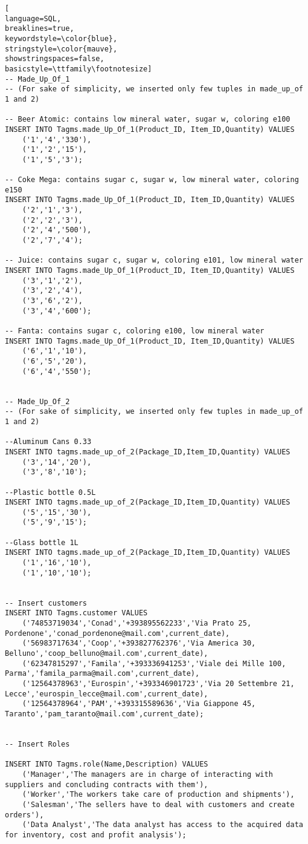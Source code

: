 \begin{lstlisting}[
language=SQL,
breaklines=true,
keywordstyle=\color{blue},
stringstyle=\color{mauve},
showstringspaces=false,
basicstyle=\ttfamily\footnotesize]
-- Made_Up_Of_1
-- (For sake of simplicity, we inserted only few tuples in made_up_of 1 and 2)

-- Beer Atomic: contains low mineral water, sugar w, coloring e100
INSERT INTO Tagms.made_Up_Of_1(Product_ID, Item_ID,Quantity) VALUES
    ('1','4','330'),
    ('1','2','15'),
    ('1','5','3');

-- Coke Mega: contains sugar c, sugar w, low mineral water, coloring e150
INSERT INTO Tagms.made_Up_Of_1(Product_ID, Item_ID,Quantity) VALUES
    ('2','1','3'),
    ('2','2','3'),
    ('2','4','500'),
    ('2','7','4');

-- Juice: contains sugar c, sugar w, coloring e101, low mineral water
INSERT INTO Tagms.made_Up_Of_1(Product_ID, Item_ID,Quantity) VALUES
    ('3','1','2'),
    ('3','2','4'),
    ('3','6','2'),
    ('3','4','600');

-- Fanta: contains sugar c, coloring e100, low mineral water
INSERT INTO Tagms.made_Up_Of_1(Product_ID, Item_ID,Quantity) VALUES
    ('6','1','10'),
    ('6','5','20'),
    ('6','4','550');


-- Made_Up_Of_2
-- (For sake of simplicity, we inserted only few tuples in made_up_of 1 and 2)

--Aluminum Cans 0.33
INSERT INTO tagms.made_up_of_2(Package_ID,Item_ID,Quantity) VALUES
    ('3','14','20'),
    ('3','8','10');

--Plastic bottle 0.5L
INSERT INTO tagms.made_up_of_2(Package_ID,Item_ID,Quantity) VALUES
    ('5','15','30'),
    ('5','9','15');

--Glass bottle 1L
INSERT INTO tagms.made_up_of_2(Package_ID,Item_ID,Quantity) VALUES
    ('1','16','10'),
    ('1','10','10');


-- Insert customers
INSERT INTO Tagms.customer VALUES
    ('74853719034','Conad','+393895562233','Via Prato 25, Pordenone','conad_pordenone@mail.com',current_date),
    ('56983717634','Coop','+393827762376','Via America 30, Belluno','coop_belluno@mail.com',current_date),
    ('62347815297','Famila','+393336941253','Viale dei Mille 100, Parma','famila_parma@mail.com',current_date),
    ('12564378963','Eurospin','+393346901723','Via 20 Settembre 21, Lecce','eurospin_lecce@mail.com',current_date),
    ('12564378964','PAM','+393315589636','Via Giappone 45, Taranto','pam_taranto@mail.com',current_date);


-- Insert Roles

INSERT INTO Tagms.role(Name,Description) VALUES
    ('Manager','The managers are in charge of interacting with suppliers and concluding contracts with them'),
    ('Worker','The workers take care of production and shipments'),
    ('Salesman','The sellers have to deal with customers and create orders'),
    ('Data Analyst','The data analyst has access to the acquired data for inventory, cost and profit analysis');


\end{lstlisting}

